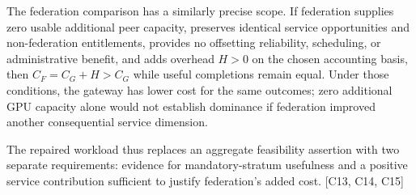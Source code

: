 \documentclass[11pt]{article}
\begin{document}
The federation comparison has a similarly precise scope. If federation supplies zero usable additional peer capacity, preserves identical service opportunities and non-federation entitlements, provides no offsetting reliability, scheduling, or administrative benefit, and adds overhead $H>0$ on the chosen accounting basis, then $C_F=C_G+H>C_G$ while useful completions remain equal. Under those conditions, the gateway has lower cost for the same outcomes; zero additional GPU capacity alone would not establish dominance if federation improved another consequential service dimension.

The repaired workload thus replaces an aggregate feasibility assertion with two separate requirements: evidence for mandatory-stratum usefulness and a positive service contribution sufficient to justify federation's added cost. [C13, C14, C15]
\end{document}
